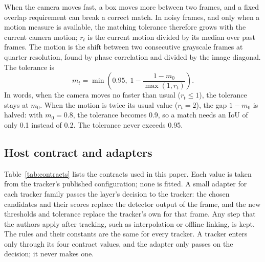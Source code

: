 \documentclass[pdflatex,sn-mathphys-num,iicol]{sn-jnl}
\begin{document}
When the camera moves fast, a box moves more between two frames, and a fixed
overlap requirement can break a correct match. In noisy frames, and only when
a motion measure is available, the matching tolerance therefore grows with
the current camera motion; $r_t$ is the current motion divided by its median
over past frames. The motion is the shift between two consecutive grayscale
frames at quarter resolution, found by phase correlation
\cite{reddy1996phasecorr} and divided by the image diagonal. The tolerance is
\begin{equation}
m_t=\min\!\left(0.95,\;1-\frac{1-m_0}{\max(1,r_t)}\right).
\label{eq:motion}
\end{equation}
In words, when the camera moves no faster than usual ($r_t\le1$), the
tolerance stays at $m_0$. When the motion is twice its usual value
($r_t=2$), the gap $1-m_0$ is halved: with $m_0=0.8$, the tolerance becomes
0.9, so a match needs an IoU of only 0.1 instead of 0.2. The tolerance never
exceeds 0.95.

\subsection{Host contract and adapters}\label{sec:contract}
Table~\ref{tab:contracts} lists the contracts used in this paper. Each value
is taken from the tracker's published configuration; none is fitted. A small
adapter for each tracker family passes the layer's decision to the tracker:
the chosen candidates and their scores replace the detector output of the
frame, and the new thresholds and tolerance replace the tracker's own for
that frame. Any step that the authors apply after tracking, such as
interpolation or offline linking, is kept. The rules and their constants are
the same for every tracker. A tracker enters only through its four contract
values, and the adapter only passes on the decision; it never makes one.
\end{document}
